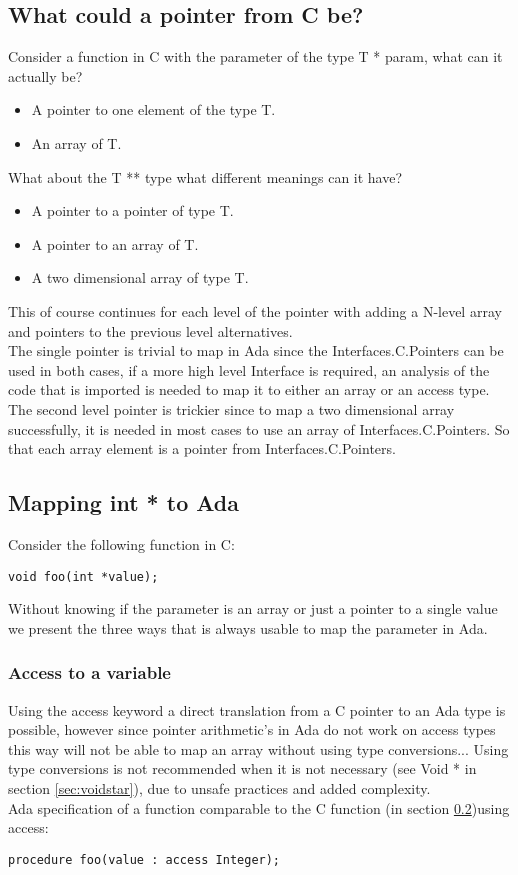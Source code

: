 \subsection{What could a pointer from C be?}
Consider a function in C with the parameter of the type T * param, what can it actually be?
\begin{itemize}
\item A pointer to one element of the type T.
\item An array of T.
\end{itemize}
What about the T ** type what different meanings can it have?
\begin{itemize}
\item A pointer to a pointer of type T.
\item A pointer to an array of T.
\item A two dimensional array of type T.
\end{itemize}
This of course continues for each level of the pointer with adding a N-level array and pointers to the previous level alternatives.
\\
The single pointer is trivial to map in Ada since the Interfaces.C.Pointers can be used in both cases, if a more high level Interface is required, an analysis of the code that is imported is needed to map it to either an array or an access type. The second level pointer is trickier since to map a two dimensional array successfully, it is needed in most cases to use an array of Interfaces.C.Pointers. So that each array element is a pointer from Interfaces.C.Pointers.
\subsection{Mapping int * to Ada}\label{sec:startoada}
Consider the following function in C:
\begin{lstlisting}
void foo(int *value);
\end{lstlisting}
Without knowing if the parameter is an array or just a pointer to a single value we present the three ways that is always usable to map the parameter in Ada.
\subsubsection{Access to a variable}
Using the access keyword a direct translation from a C pointer to an Ada type is possible, however since pointer arithmetic's in Ada do not work on access types this way will not be able to map an array without using type conversions... Using type conversions is not recommended when it is not necessary (see Void * in section  \ref{sec:voidstar}), due to unsafe practices and added complexity. 
\\
Ada specification of a function comparable to the C function (in section \ref{sec:startoada})using access:
\begin{lstlisting}
procedure foo(value : access Integer);
\end{lstlisting}
